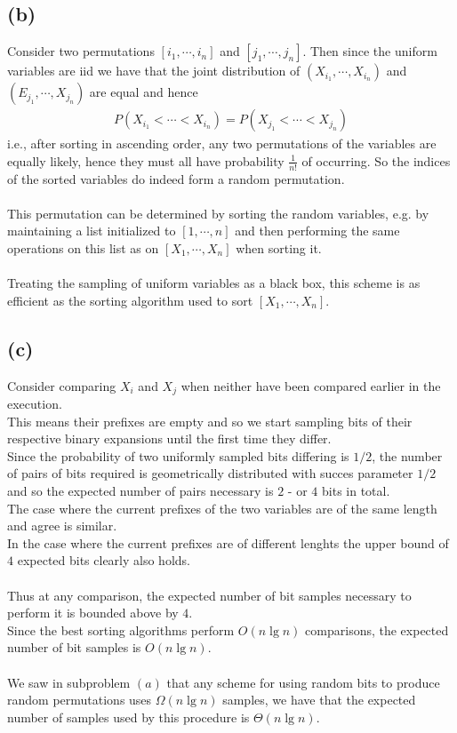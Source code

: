 \subsection*{(b)}
Consider two permutations $\left[ i_1,\cdots,i_n \right]$ and $\left[ j_1,\cdots,j_n \right]$.
Then since the uniform variables are iid we have that the joint distribution of
$\left( X_{i_1},\cdots, X_{i_n} \right)$ and
$\left( E_{j_1},\cdots,X_{j_n} \right)$
are equal and hence
\begin{align*}
	P\left( X_{i_1}<\cdots<X_{i_n} \right)=P\left( X_{j_1}<\cdots<X_{j_n} \right)
\end{align*}
i.e., after sorting in ascending order, any two permutations of the variables are equally likely, 
hence they must all have probability $\frac{1}{n!}$ of occurring. 
So the indices of the sorted variables do indeed form a random permutation. \\ \\
This permutation can be determined by sorting the random variables, 
e.g. by maintaining a list initialized to $\left[ 1,\cdots,n \right]$ 
and then performing the same operations on this list as on $\left[ X_1,\cdots,X_n \right]$ 
when sorting it. \\ \\
Treating the sampling of uniform variables as a black box,
this scheme is as efficient as the sorting algorithm used to sort $\left[ X_1,\cdots,X_n \right]$.
\subsection*{(c)}
Consider comparing $X_i$ and $X_j$ when neither have been compared earlier in the execution. \\
This means their prefixes are empty and so we start sampling bits of their respective binary expansions
until the first time they differ. \\
Since the probability of two uniformly sampled bits differing is $1/2$, the number of pairs of bits required
is geometrically distributed with succes parameter $1/2$
and so the expected number of pairs necessary is $2$ - or $4$ bits in total. \\
The case where the current prefixes of the two variables are of the same length and agree is similar. \\
In the case where the current prefixes are of different lenghts the upper bound of $4$ expected bits clearly also holds. \\ \\
Thus at any comparison,
the expected number of bit samples necessary to perform it is bounded above by $4$. \\
Since the best sorting algorithms perform $O(n \lg n)$ comparisons,
the expected number of bit samples is $O(n \lg n)$. \\ \\
We saw in subproblem $(a)$ that any scheme for using random bits to produce random permutations 
uses $\Omega(n \lg n)$ samples,
we have that the expected number of samples used by this procedure is $\Theta(n \lg n)$.
